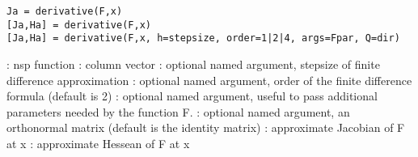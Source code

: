 
\begin{mandesc}
\end{mandesc}

\begin{calling_sequence}
\begin{verbatim}
Ja = derivative(F,x)
[Ja,Ha] = derivative(F,x)
[Ja,Ha] = derivative(F,x, h=stepsize, order=1|2|4, args=Fpar, Q=dir)
\end{verbatim}
\end{calling_sequence}

\begin{parameters}
  \begin{varlist}
    : nsp function
    : column vector
    : optional named argument, stepsize of finite difference approximation
    : optional named argument, order of the finite difference formula (default is 2)
    : optional named argument, useful to pass additional parameters needed by the function F.
    : optional named argument, an orthonormal matrix (default is the identity matrix)
    : approximate Jacobian of F at x
    : approximate Hessean of F at x
  \end{varlist}
\end{parameters}

